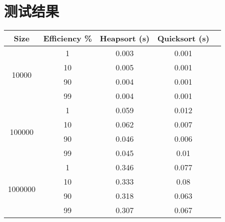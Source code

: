 \documentclass[a4paper]{article}
\begin{document}
\section{测试结果}
\begin{center}
\begin{tabular}{|c|c|c|c|c|}
    \hline
    Size & Efficiency \% & Heapsort (s) & Quicksort (s) \\
    \hline
    \multirow{4}{4em}{10000} & 1 & 0.003 & 0.001 \\
    & 10 & 0.005 & 0.001 \\
    & 90 & 0.004 & 0.001 \\
    & 99 & 0.004 & 0.001 \\
    \hline
    \multirow{4}{4em}{100000} & 1 & 0.059 & 0.012 \\
    & 10 & 0.062 & 0.007 \\
    & 90 & 0.046 & 0.006 \\
    & 99 & 0.045 & 0.01 \\
    \hline
    \multirow{4}{4em}{1000000} & 1 & 0.346 & 0.077\\
    & 10 & 0.333 & 0.08 \\
    & 90 & 0.318 & 0.063 \\
    & 99 & 0.307 & 0.067 \\
    \hline
\end{tabular}
\end{center}
\end{document}
